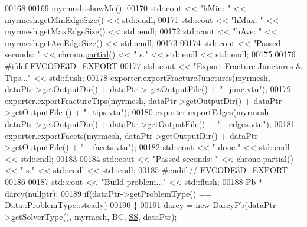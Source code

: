 \begin{DoxyCode}
00168 
00169     myrmesh.\hyperlink{classFVCode3D_1_1Rigid__Mesh_a41b79ff22b6d03329967d1ffbe463679}{showMe}();
00170     std::cout << \textcolor{stringliteral}{"hMin: "} << myrmesh.\hyperlink{classFVCode3D_1_1Rigid__Mesh_aa814be4bc0f5471c92524a8fce5028f3}{getMinEdgeSize}() << std::endl;
00171     std::cout << \textcolor{stringliteral}{"hMax: "} << myrmesh.\hyperlink{classFVCode3D_1_1Rigid__Mesh_a03fd4643756039db62f827e2ad94cdaf}{getMaxEdgeSize}() << std::endl;
00172     std::cout << \textcolor{stringliteral}{"hAve: "} << myrmesh.\hyperlink{classFVCode3D_1_1Rigid__Mesh_a55d65366017440b6a5e54e292d5ba1fe}{getAveEdgeSize}() << std::endl;
00173 
00174     std::cout << \textcolor{stringliteral}{"Passed seconds: "} << chrono.\hyperlink{classFVCode3D_1_1Chrono_a245a0c47da85e80de56e85d3689b925b}{partial}() << \textcolor{stringliteral}{" s."} << std::endl << std::endl;
00175 
00176 \textcolor{preprocessor}{#ifdef FVCODE3D\_EXPORT}
00177     std::cout << \textcolor{stringliteral}{"Export Fracture Junctures & Tips..."} << std::flush;
00178     exporter.\hyperlink{classFVCode3D_1_1ExporterVTU_aef7601095b83f975d009f9cb68563ae4}{exportFractureJunctures}(myrmesh, dataPtr->getOutputDir() + dataPtr->
      getOutputFile() + \textcolor{stringliteral}{"\_junc.vtu"});
00179     exporter.\hyperlink{classFVCode3D_1_1ExporterVTU_a95853064ccbdab9ab24b3aa6f67ff19c}{exportFractureTips}(myrmesh, dataPtr->getOutputDir() + dataPtr->getOutputFile
      () + \textcolor{stringliteral}{"\_tips.vtu"});
00180     exporter.\hyperlink{classFVCode3D_1_1ExporterVTU_a3ee8f96689d31f85372b580caffdcc7e}{exportEdges}(myrmesh, dataPtr->getOutputDir() + dataPtr->getOutputFile() + \textcolor{stringliteral}{"
      \_edges.vtu"});
00181     exporter.\hyperlink{classFVCode3D_1_1ExporterVTU_a15e1d2e6940ac0a37bf3c4d0ee5dc4d5}{exportFacets}(myrmesh, dataPtr->getOutputDir() + dataPtr->getOutputFile() + \textcolor{stringliteral}{"
      \_facets.vtu"});
00182     std::cout << \textcolor{stringliteral}{" done."} << std::endl << std::endl;
00183 
00184     std::cout << \textcolor{stringliteral}{"Passed seconds: "} << chrono.\hyperlink{classFVCode3D_1_1Chrono_a245a0c47da85e80de56e85d3689b925b}{partial}() << \textcolor{stringliteral}{" s."} << std::endl << std::endl;
00185 \textcolor{preprocessor}{#endif // FVCODE3D\_EXPORT}
00186 
00187     std::cout << \textcolor{stringliteral}{"Build problem..."} << std::flush;
00188     \hyperlink{classFVCode3D_1_1Problem}{Pb} * darcy(\textcolor{keyword}{nullptr});
00189     \textcolor{keywordflow}{if}(dataPtr->getProblemType() == Data::ProblemType::steady)
00190     \{
00191         darcy = \textcolor{keyword}{new} \hyperlink{main_8cpp_ab0de87680f9f2dfa547e659c7da3d1e4}{DarcyPb}(dataPtr->getSolverType(), myrmesh, BC, \hyperlink{namespaceFVCode3D_ae8b0f97f0774db9f0881cfc5f31d93f4}{SS}, dataPtr);

\end{DoxyCode}
